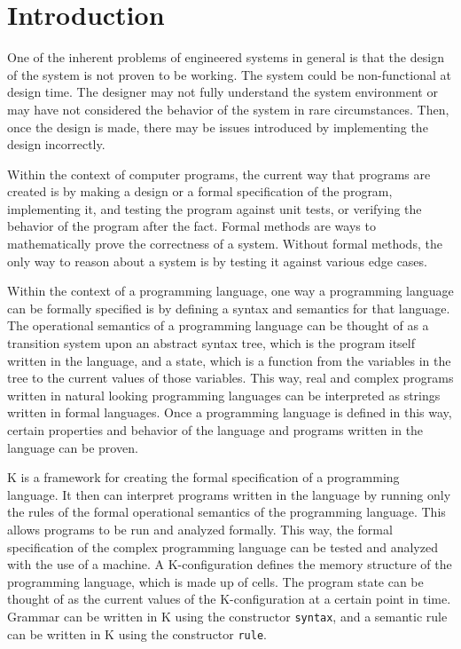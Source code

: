 \chapter{Introduction}
One of the inherent problems of engineered systems in general is that the design of the system is not proven to be working. The system could be non-functional at design time. The designer may not fully understand the system environment or may have not considered the behavior of the system in rare circumstances. Then, once the design is made, there may be issues introduced by implementing the design incorrectly.

Within the context of computer programs, the current way that programs are created is by making a design or a formal specification of the program, implementing it, and testing the program against unit tests, or verifying the behavior of the program after the fact.
Formal methods are ways to mathematically prove the correctness of a system. Without formal methods, the only way to reason about a system is by testing it against various edge cases.

Within the context of a programming language, one way a programming language can be formally specified is by defining a syntax and semantics for that language.
The operational semantics of a programming language can be thought of as a transition system upon an abstract syntax tree, which is the program itself written in the language, and a state, which is a function from the variables in the tree to the current values of those variables. 
This way, real and complex programs written in natural looking programming languages can be interpreted as strings written in formal languages. Once a programming language is defined in this way, certain properties and behavior of the language and programs written in the language can be proven.

K \cite{rosu-serbanuta-2010-jlap, KFrame} is a framework for creating the formal specification of a programming language. It then can interpret programs written in the language by running only the rules of the formal operational semantics of the programming language. This allows programs to be run and analyzed formally. This way, the formal specification of the complex programming language can be tested and analyzed with the use of a machine.
A K-configuration defines the memory structure of the programming language, which is made up of cells. The program state can be thought of as the current values of the K-configuration at a certain point in time.
Grammar can be written in K using the constructor \texttt{syntax}, and a semantic rule can be written in K using the constructor \texttt{rule}.

